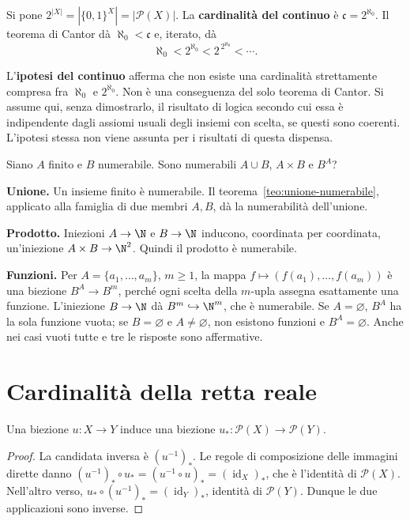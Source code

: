 \begin{definizione}
Si pone $2^{|X|}=|\{0,1\}^X|=|\mathcal P(X)|$. La \textbf{cardinalità del continuo} è $\mathfrak c=2^{\aleph_0}$. Il teorema di Cantor dà $\aleph_0<\mathfrak c$ e, iterato, dà
\[
\aleph_0<2^{\aleph_0}<2^{\,2^{\aleph_0}}<\cdots.
\]
\end{definizione}

\begin{osservazione}
L'\textbf{ipotesi del continuo} afferma che non esiste una cardinalità strettamente compresa fra $\aleph_0$ e $2^{\aleph_0}$. Non è una conseguenza del solo teorema di Cantor. Si assume qui, senza dimostrarlo, il risultato di logica secondo cui essa è indipendente dagli assiomi usuali degli insiemi con scelta, se questi sono coerenti. L'ipotesi stessa non viene assunta per i risultati di questa dispensa.
\end{osservazione}

\begin{esercizio}
Siano $A$ finito e $B$ numerabile. Sono numerabili $A\cup B$, $A\times B$ e $B^A$?
\end{esercizio}
\begin{svolgimento}
\textbf{Unione.} Un insieme finito è numerabile. Il teorema~\ref{teo:unione-numerabile}, applicato alla famiglia di due membri $A,B$, dà la numerabilità dell'unione.

\textbf{Prodotto.} Iniezioni $A\to\N$ e $B\to\N$ inducono, coordinata per coordinata, un'iniezione $A\times B\to\N^2$. Quindi il prodotto è numerabile.

\textbf{Funzioni.} Per $A=\{a_1,\ldots,a_m\}$, $m\ge1$, la mappa $f\mapsto(f(a_1),\ldots,f(a_m))$ è una biezione $B^A\to B^m$, perché ogni scelta della $m$-upla assegna esattamente una funzione. L'iniezione $B\to\N$ dà $B^m\hookrightarrow\N^m$, che è numerabile. Se $A=\varnothing$, $B^A$ ha la sola funzione vuota; se $B=\varnothing$ e $A\ne\varnothing$, non esistono funzioni e $B^A=\varnothing$. Anche nei casi vuoti tutte e tre le risposte sono affermative.
\end{svolgimento}

\section{Cardinalità della retta reale}
\begin{proposizione}
Una biezione $u:X\to Y$ induce una biezione $u_*:\mathcal P(X)\to\mathcal P(Y)$.
\end{proposizione}
\begin{proof}
La candidata inversa è $(u^{-1})_*$. Le regole di composizione delle immagini dirette danno $(u^{-1})_*\circ u_*=(u^{-1}\circ u)_*=(\operatorname{id}_X)_*$, che è l'identità di $\mathcal P(X)$. Nell'altro verso, $u_*\circ(u^{-1})_*=(\operatorname{id}_Y)_*$, identità di $\mathcal P(Y)$. Dunque le due applicazioni sono inverse.
\end{proof}

